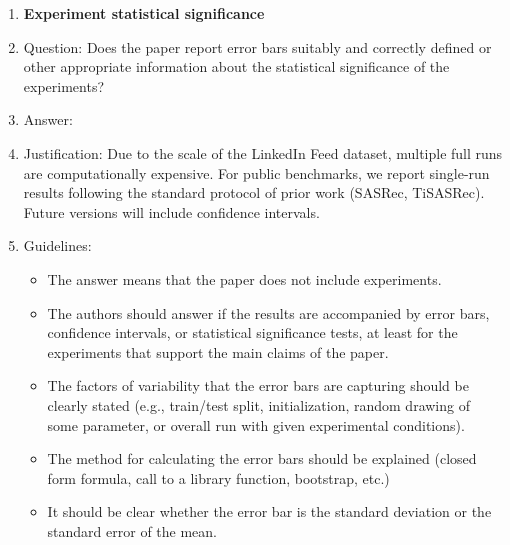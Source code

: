 \begin{enumerate}
\item {\bf Experiment statistical significance}
    \item[] Question: Does the paper report error bars suitably and correctly defined or other appropriate information about the statistical significance of the experiments?
    \item[] Answer: \answerNo{}
    \item[] Justification: Due to the scale of the LinkedIn Feed dataset, multiple full runs are computationally expensive. For public benchmarks, we report single-run results following the standard protocol of prior work (SASRec, TiSASRec). Future versions will include confidence intervals.
    \item[] Guidelines:
    \begin{itemize}
        \item The answer \answerNA{} means that the paper does not include experiments.
        \item The authors should answer \answerYes{} if the results are accompanied by error bars, confidence intervals, or statistical significance tests, at least for the experiments that support the main claims of the paper.
        \item The factors of variability that the error bars are capturing should be clearly stated (e.g., train/test split, initialization, random drawing of some parameter, or overall run with given experimental conditions).
        \item The method for calculating the error bars should be explained (closed form formula, call to a library function, bootstrap, etc.)
        \item It should be clear whether the error bar is the standard deviation or the standard error of the mean.
    \end{itemize}


\end{enumerate}
